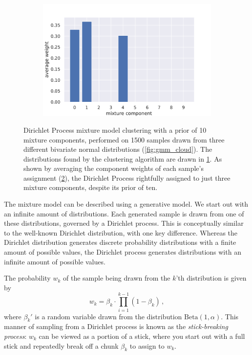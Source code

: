 \begin{figure}[tbp]
\begin{subfigure}[b]{0.49\textwidth}
    \caption{\label{fig:gmm_dist}}
  \end{subfigure}
  \begin{subfigure}[b]{0.75\textwidth}
    \includegraphics[width=\textwidth]{figures/gmm_assignments.pdf}
    \caption{\label{fig:gmm_ass}}
  \end{subfigure}
  \caption{Dirichlet Process mixture model clustering with a prior of 10 mixture
    components, performed on 1500 samples drawn from three different bivariate
    normal distributions (\cref{fig:gmm_cloud}). The distributions found by the
    clustering algorithm are drawn in \cref{fig:gmm_dist}. As shown by averaging
    the component weights of each sample's assignment (\cref{fig:gmm_ass}), the
    Dirichlet Process rightfully assigned to just three mixture components,
  despite its prior of ten.\label{fig:gmm_example}}
\end{figure}

The mixture model can be described using a generative model. We start out with
an infinite amount of distributions. Each generated sample is drawn from one
of these distributions, governed by a Dirichlet process. This is conceptually
similar to the well-known Dirichlet distribution, with one key difference.
Whereas the Dirichlet distribution generates discrete probability distributions
with a finite amount of possible values, the Dirichlet process generates
distributions with an infinite amount of possible values.\citep{dirichlet}


The probability $w_k$ of the sample being drawn from the $k$'th distribution is
given by
\begin{equation}
  w_k = \beta_k \cdot \prod_{i=1}^{k-1} (1 - \beta_k)\,,
\end{equation}
where $\beta_k'$ is a random variable drawn from the distribution
$\mathrm{Beta}(1, \alpha)$. This manner of sampling from a Dirichlet process
is known as the \emph{stick-breaking process}: $w_k$ can be viewed as a
portion of a stick, where you start out with a full stick and repeatedly break
off a chunk $\beta_k$ to assign to $w_k$.


